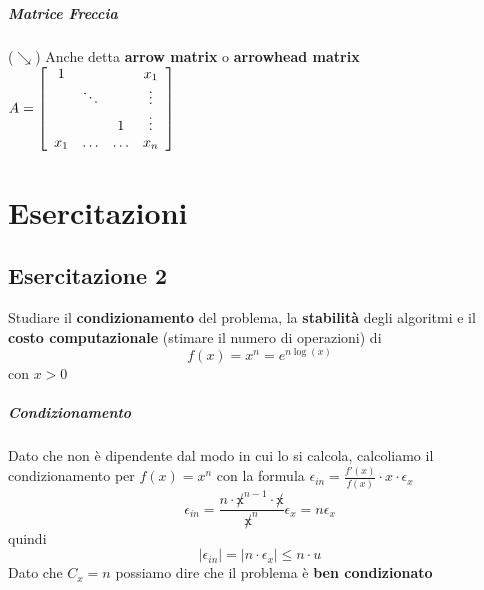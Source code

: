 \documentclass[10pt]{book}
\begin{document}
\paragraph{Matrice Freccia} ($\searrow$) Anche detta \textbf{arrow matrix} o \textbf{arrowhead matrix} \begin{math}
A = \left[
\begin{array}{c c c c}
	1 & & & x_1\\
	& \ddots & & \vdots\\
	& & 1 & \vdots\\
	x_1 & \ldots & \ldots & x_n
\end{array}
\right]
\end{math}
\chapter{Esercitazioni}
\section{Esercitazione 2}
Studiare il \textbf{condizionamento} del problema, la \textbf{stabilità} degli algoritmi e il \textbf{costo computazionale} (stimare il numero di operazioni) di $$f(x) = x^n = e^{n\log(x)}$$ con $x > 0$
\paragraph{Condizionamento} Dato che non è dipendente dal modo in cui lo si calcola, calcoliamo il condizionamento per $f(x) = x^n$ con la formula $\epsilon_{in} = \frac{f'(x)}{f(x)}\cdot x\cdot\epsilon_x$ $$\epsilon_{in} = \frac{n\cdot \not x^{n-1} \cdot \not x}{\not x^n}\epsilon_x = n\epsilon_x$$ quindi $$|\epsilon_{in}| = |n\cdot \epsilon_x| \leq n\cdot u$$
Dato che $C_x = n$ possiamo dire che il problema è \textbf{ben condizionato}
\end{document}
